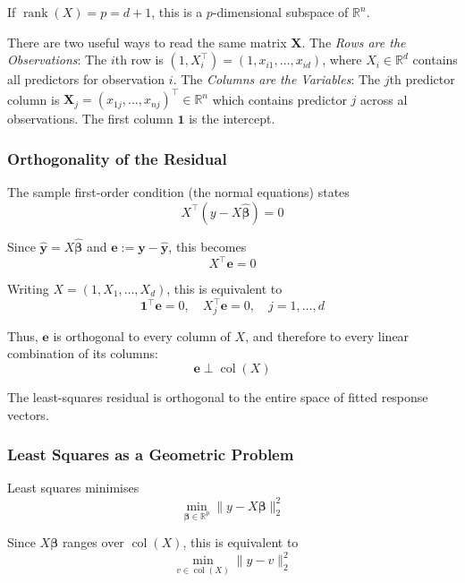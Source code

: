 If $\operatorname{rank}(X) = p = d+1$, this is a $p$-dimensional subspace of $\mathbb{R}^n$.

\noindent
There are two useful ways to read the same matrix $\bm{X}$. The \textit{Rows are the Observations}: The $i$th row is $(1,X_i^\top)=(1,x_{i1},\dots,x_{id})$, where $X_i \in \mathbb{R}^d$ contains all predictors for observation $i$. The \textit{Columns are the Variables}: The $j$th predictor column is $\bm{X}_j=(x_{1j},\dots,x_{nj})^\top \in \mathbb{R}^n$ which contains predictor $j$ across al observations. The first column $\bm{1}$ is the intercept.

\subsubsection{Orthogonality of the Residual}
The sample first-order condition (the normal equations) states
\begin{equation*}
    X^\top(y - X\hat{\bm\beta}) = 0
\end{equation*}

Since $\hat{\bm y} = X\hat{\bm\beta}$ and $\bm e := \bm y - \hat{\bm y}$, this becomes
\begin{equation*}
    X^\top \bm e = 0
\end{equation*}

Writing $X = (1, X_1, \dots, X_d)$, this is equivalent to
\begin{equation*}
    \bm{1}^\top \bm e = 0, \quad X_j^\top \bm e = 0, \quad j = 1,\dots,d
\end{equation*}

Thus, $\bm e$ is orthogonal to every column of $X$, and therefore to every linear combination of its columns:
\begin{equation*}
    \bm e \perp \operatorname{col}(X)
\end{equation*}

The least-squares residual is orthogonal to the entire space of fitted response vectors.

\subsubsection{Least Squares as a Geometric Problem}
Least squares minimises
\begin{equation*}
    \min_{\bm\beta \in \mathbb{R}^p} \lVert y - X\bm\beta \rVert_2^2
\end{equation*}

Since $X\bm\beta$ ranges over $\operatorname{col}(X)$, this is equivalent to
\begin{equation*}
    \min_{v \in \operatorname{col}(X)} \lVert y - v \rVert_2^2
\end{equation*}

